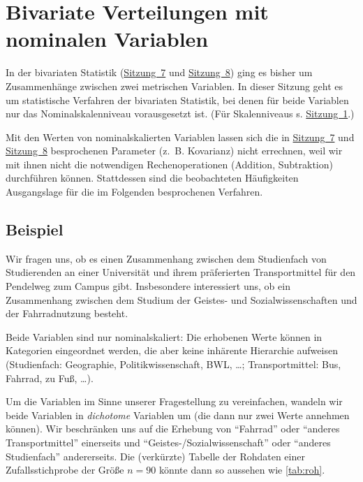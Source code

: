 \documentclass[
  11pt,
  ngerman,
  a4paper,
]{report}
\begin{document}
\hypertarget{bivariate-verteilungen-mit-nominalen-variablen}{%
\section{Bivariate Verteilungen mit nominalen Variablen}\label{bivariate-verteilungen-mit-nominalen-variablen}}

In der bivariaten Statistik (\protect\hyperlink{korrelation}{Sitzung~7} und \protect\hyperlink{lineare-regression}{Sitzung~8}) ging es bisher um Zusammenhänge zwischen zwei metrischen Variablen. In dieser Sitzung geht es um statistische Verfahren der bivariaten Statistik, bei denen für beide Variablen nur das Nominalskalenniveau vorausgesetzt ist. (Für Skalenniveaus s. \protect\hyperlink{skalenniveaus}{Sitzung~1}.)

Mit den Werten von nominalskalierten Variablen lassen sich die in \protect\hyperlink{korrelation}{Sitzung~7} und \protect\hyperlink{lineare-regression}{Sitzung~8} besprochenen Parameter (z.~B. Kovarianz) nicht errechnen, weil wir mit ihnen nicht die notwendigen Rechenoperationen (Addition, Subtraktion) durchführen können. Stattdessen sind die beobachteten Häufigkeiten Ausgangslage für die im Folgenden besprochenen Verfahren.

\hypertarget{beispiel-29}{%
\subsection{Beispiel}\label{beispiel-29}}

Wir fragen uns, ob es einen Zusammenhang zwischen dem Studienfach von Studierenden an einer Universität und ihrem präferierten Transportmittel für den Pendelweg zum Campus gibt. Insbesondere interessiert uns, ob ein Zusammenhang zwischen dem Studium der Geistes- und Sozialwissenschaften und der Fahrradnutzung besteht.

Beide Variablen sind nur nominalskaliert: Die erhobenen Werte können in Kategorien eingeordnet werden, die aber keine inhärente Hierarchie aufweisen (Studienfach: Geographie, Politikwissenschaft, BWL, \ldots; Transportmittel: Bus, Fahrrad, zu Fuß, \ldots).

Um die Variablen im Sinne unserer Fragestellung zu vereinfachen, wandeln wir beide Variablen in \emph{dichotome} Variablen um (die dann nur zwei Werte annehmen können). Wir beschränken uns auf die Erhebung von \enquote{Fahrrad} oder \enquote{anderes Transportmittel} einerseits und \enquote{Geistes-/Sozialwissenschaft} oder \enquote{anderes Studienfach} andererseits. Die (verkürzte) Tabelle der Rohdaten einer Zufallsstichprobe der Größe \(n=90\) könnte dann so aussehen wie \ref{tab:roh}.
\end{document}

